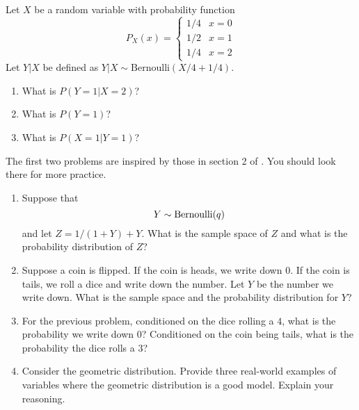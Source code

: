 \begin{exercise}
Let $X$ be a random variable with probability function
\begin{equation*}
P_X(x) = \begin{cases}
  1/4 & x=0 \\
  1/2 & x=1 \\
  1/4 & x=2
\end{cases}
\end{equation*}
Let $Y|X$ be defined as $Y|X \sim \text{Bernoulli}(X/4 + 1/4)$.
\begin{enumerate}[label=(\alph*)]
\item What is $P(Y=1|X=2)$?
\item What is $P(Y=1)$?
\item What is $P(X=1|Y=1)$?
\end{enumerate}
\end{exercise}


 



\begin{exercise}
The first two problems are inspired by those in section 2 of \cite{evans}.   You should look there for more practice. 
\begin{enumerate}[label=(\alph*)]
\item Suppose that 
\begin{equation*}
Y \sim {\rm Bernoulli}(q)
\end{equation*}
and let $Z = 1/(1+Y) + Y$. What is the sample space of $Z$ and what is the probability distribution of $Z$? %
\item Suppose a coin is flipped. If the coin is heads, we write down $0$. If the coin is tails, we roll a dice and write down the number. Let $Y$ be the number we write down.  What is the sample space and the probability distribution for $Y$? 
\item For the previous problem, conditioned on the dice rolling a $4$, what is the probability we write down $0$? Conditioned on the coin being tails, what is the probability the dice rolls a $3$?
\item Consider the geometric distribution. Provide three real-world examples of variables where the geometric distribution is a good model. Explain your reasoning. 
\end{enumerate}
\end{exercise}




